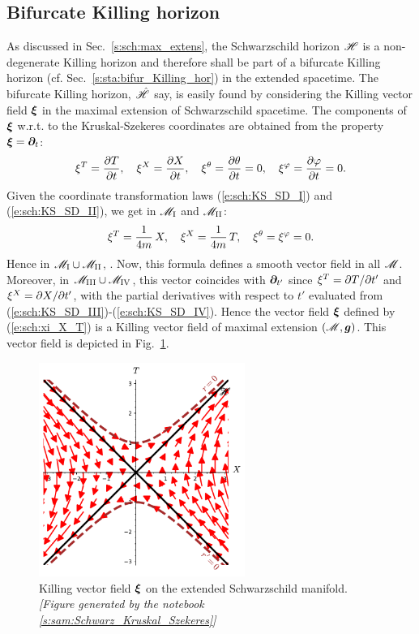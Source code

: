 \subsection{Bifurcate Killing horizon} \label{s:max:bifur_Kill_hor}

As discussed in Sec.~\ref{s:sch:max_extens}, the Schwarzschild horizon
$\mathscr{H}$ is
a non-degenerate Killing horizon and therefore shall be part of
a bifurcate Killing horizon (cf. Sec.~\ref{s:sta:bifur_Killing_hor})
in the extended spacetime.
The bifurcate Killing horizon, $\hat{\mathscr{H}}$ say, is easily found by
considering the Killing vector field $\bm{\xi}$ in the maximal extension
of Schwarzschild spacetime. The components of $\bm{\xi}$ w.r.t. to the
Kruskal-Szekeres coordinates are obtained from the
property $\bm{\xi} = \bm{\partial}_t$:
\[
    \xi^T = \frac{\partial T}{\partial t}, \quad
    \xi^X = \frac{\partial X}{\partial t}, \quad
    \xi^\theta = \frac{\partial \theta}{\partial t} = 0, \quad
    \xi^\varphi = \frac{\partial \varphi}{\partial t} = 0 .
\]
Given the coordinate transformation laws (\ref{e:sch:KS_SD_I})
and (\ref{e:sch:KS_SD_II}), we get in
$\mathscr{M}_{\rm I}$ and $\mathscr{M}_{\rm II}$:
\[
    \xi^T = \frac{1}{4m} \, X, \quad
    \xi^X = \frac{1}{4m} \, T , \quad
    \xi^\theta = \xi^\varphi = 0 .
\]
Hence in $\mathscr{M}_{\rm I}\cup\mathscr{M}_{\rm II}$,
\be \label{e:sch:xi_X_T}
    .
\ee
Now, this formula defines a smooth vector field in all $\mathscr{M}$.
Moreover, in $\mathscr{M}_{\rm III}\cup\mathscr{M}_{\rm IV}$, this vector coincides with
$\bm{\partial}_{t'}$ since $\xi^T = {\partial T}/{\partial t'}$ and $\xi^X = {\partial X}/{\partial t'}$,
with the partial derivatives with respect to $t'$ evaluated from
(\ref{e:sch:KS_SD_III})-(\ref{e:sch:KS_SD_IV}). Hence the vector field
$\bm{\xi}$ defined by (\ref{e:sch:xi_X_T}) is a Killing vector field
of maximal extension $(\mathscr{M},\bm{g})$. This vector field is depicted in
Fig.~\ref{f:sch:xi_extend}.

\begin{figure}
\centerline{\includegraphics[width=0.6\textwidth]{max_xi_extend.pdf}}
\caption[]{\label{f:sch:xi_extend} \footnotesize
Killing vector field $\bm{\xi}$ on the extended Schwarzschild manifold.
\textsl{[Figure generated by the notebook \ref{s:sam:Schwarz_Kruskal_Szekeres}]}
}
\end{figure}


